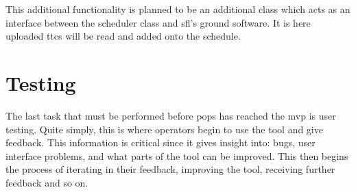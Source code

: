 This additional functionality is planned to be an additional class which acts
as an interface between the scheduler class and \gls{sfl}'s ground software. It
is here uploaded \glspl{ttc} will be read and added onto the schedule.



\section{Testing}

The last task that must be performed before \gls{pops} has reached the
\gls{mvp} is user testing. Quite simply, this is where operators begin to use
the tool and give feedback. This information is critical since it gives insight
into: bugs, user interface problems, and what parts of the tool can be
improved.  This then begins the process of iterating in their feedback,
improving the tool, receiving further feedback and so on.


